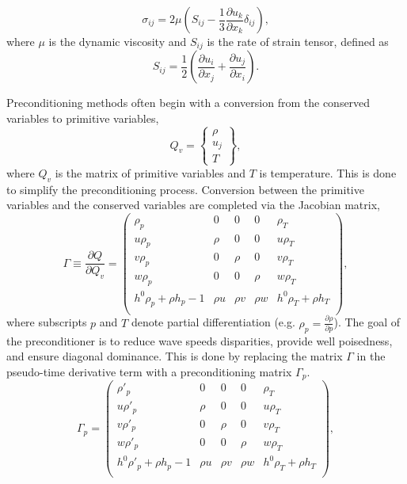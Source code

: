 \documentclass[draft]{aiaa-pretty}
\begin{document}
\begin{equation}
\sigma_{ij} = 2\mu\left(S_{ij}-\frac{1}{3}\frac{\partial u_k}{\partial x_k}\delta_{ij}\right), 
\end{equation}
where $\mu$ is the dynamic viscosity and $S_{ij}$ is the rate of strain tensor, defined as
\begin{equation}
 S_{ij}=\frac{1}{2}\left(\frac{\partial u_i}{\partial x_j}+\frac{\partial u_j}{\partial x_i}\right).
\end{equation}


Preconditioning methods often begin with a conversion from the conserved variables to primitive variables,
\begin{equation}
 Q_v = \begin{Bmatrix}
        \rho \\ u_j \\ T
       \end{Bmatrix},
\end{equation}
where $Q_v$ is the matrix of primitive variables and $T$ is temperature.  This is done to simplify the preconditioning process.  Conversion between the primitive variables
and the conserved variables are completed via the Jacobian matrix,
\begin{equation}
 \Gamma \equiv \frac{\partial Q}{\partial Q_v} =   
 \begin{pmatrix}
    \rho_p                  & 0      & 0      & 0		& \rho_T           \\
    u\rho_p                 & \rho   & 0      & 0		& u\rho_T           \\
    v\rho_p				    & 0		& \rho	 &  0		& v\rho_T		     \\
    w\rho_p				    & 0		& 0		 &  \rho		& w\rho_T		      \\
    h^0\rho_p + \rho h_p -1 & \rho u & \rho v & \rho w   & h^0\rho_T + \rho h_T \\
  \end{pmatrix},
\end{equation}
where subscripts $p$ and $T$ denote partial differentiation (e.g. $\rho_p = \frac{\partial \rho}{\partial p}$).  The goal of the preconditioner is to reduce wave speeds 
disparities, provide well poisedness, and ensure diagonal dominance. This is done by replacing the matrix $\Gamma$ in the pseudo-time derivative term with a preconditioning 
matrix $\Gamma_p$.
\begin{equation}
  \Gamma_p =    
 \begin{pmatrix}
    \rho'_p                  & 0      & 0      & 0		& \rho_T           \\
    u\rho'_p                 & \rho   & 0      & 0		& u\rho_T           \\
    v\rho'_p				    & 0		& \rho	 &  0		& v\rho_T		     \\
    w\rho'_p				    & 0		& 0		 &  \rho		& w\rho_T		      \\
    h^0\rho'_p + \rho h_p -1 & \rho u & \rho v & \rho w   & h^0\rho_T + \rho h_T \\
  \end{pmatrix},
\label{PreconJacobian}
\end{equation}
\end{document}
